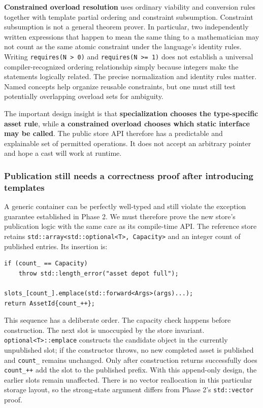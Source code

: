\textbf{Constrained overload resolution} uses ordinary viability and conversion rules together with template partial ordering and constraint subsumption. Constraint subsumption is not a general theorem prover. In particular, two independently written expressions that happen to mean the same thing to a mathematician may not count as the same atomic constraint under the language's identity rules. Writing \texttt{requires(N\ \textgreater{}\ 0)} and \texttt{requires(N\ \textgreater{}=\ 1)} does not establish a universal compiler-recognized ordering relationship simply because integers make the statements logically related. The precise normalization and identity rules matter. Named concepts help organize reusable constraints, but one must still test potentially overlapping overload sets for ambiguity.

The important design insight is that \textbf{specialization chooses the type-specific asset rule}, while \textbf{a constrained overload chooses which static interface may be called}. The public store API therefore has a predictable and explainable set of permitted operations. It does not accept an arbitrary pointer and hope a cast will work at runtime.

\subsubsection{Publication still needs a correctness proof after introducing templates}\label{publication-still-needs-a-correctness-proof-after-introducing-templates}

A generic container can be perfectly well-typed and still violate the exception guarantee established in Phase 2. We must therefore prove the new store's publication logic with the same care as its compile-time API. The reference store retains \texttt{std::array\textless{}std::optional\textless{}T\textgreater{},\ Capacity\textgreater{}} and an integer count of published entries. Its insertion is:

\begin{verbatim}
if (count_ == Capacity)
    throw std::length_error("asset depot full");

slots_[count_].emplace(std::forward<Args>(args)...);
return AssetId{count_++};
\end{verbatim}

This sequence has a deliberate order. The capacity check happens before construction. The next slot is unoccupied by the store invariant. \texttt{optional\textless{}T\textgreater{}::emplace} constructs the candidate object in the currently unpublished slot; if the constructor throws, no new completed asset is published and \texttt{count\_} remains unchanged. Only after construction returns successfully does \texttt{count\_++} add the slot to the published prefix. With this append-only design, the earlier slots remain unaffected. There is no vector reallocation in this particular storage layout, so the strong-state argument differs from Phase 2's \texttt{std::vector} proof.

